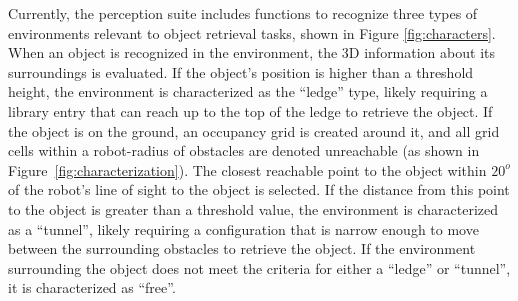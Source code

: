 \documentclass[conference]{IEEEtran}
\begin{document}

Currently, the perception suite includes functions to recognize three types of environments relevant to object retrieval tasks, shown in Figure \ref{fig:characters}.  When an object is recognized in the environment, the 3D information about its surroundings is evaluated. If the object's position is higher than a threshold height, the environment is characterized as the ``ledge'' type, likely requiring a library entry that can reach up to the top of the ledge to retrieve the object.
If the object is on the ground, an occupancy grid is created around it, and all grid cells within a robot-radius of obstacles are denoted unreachable (as shown in Figure~\ref{fig:characterization}). The closest reachable point to the object within $20^o$ of the robot's line of sight to the object is selected. If the distance from this point to the object is greater than a threshold value, the environment is characterized as a ``tunnel'', likely requiring a configuration that is narrow enough to move between the surrounding obstacles to retrieve the object.
If the environment surrounding the object does not meet the criteria for either a ``ledge'' or ``tunnel'', it is characterized as ``free''.
%
\end{document}
